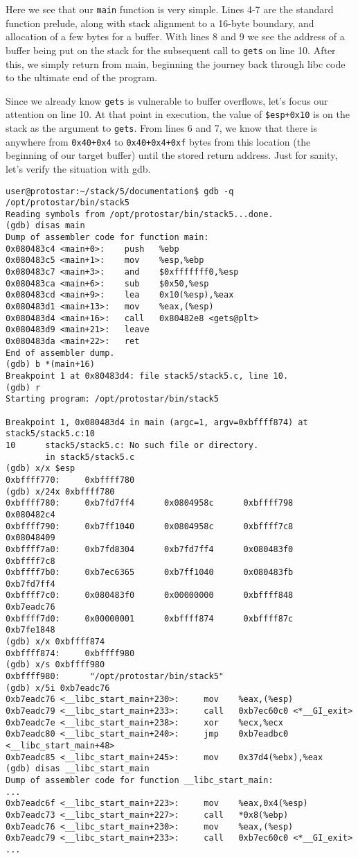 Here we see that our \texttt{main} function is very simple. Lines 4-7 are the standard function prelude, along
with stack alignment to a 16-byte boundary, and allocation of a few bytes for a buffer. With lines 8 and 9
we see the address of a buffer being put on the stack for the subsequent call to \texttt{gets} on line 10. After this,
we simply return from main, beginning the journey back through libc code to the ultimate end of the program.

Since we already know \texttt{gets} is vulnerable to buffer overflows, let's focus our attention on line 10.
At that point in execution, the value of \texttt{\$esp+0x10} is on the stack as the argument to \texttt{gets}.
From lines 6 and 7, we know that there is anywhere from \texttt{0x40+0x4} to \texttt{0x40+0x4+0xf} bytes
from this location (the beginning of our target buffer) until the stored return address. Just for sanity, 
let's verify the situation with gdb.

\begin{lstlisting}
user@protostar:~/stack/5/documentation$ gdb -q /opt/protostar/bin/stack5
Reading symbols from /opt/protostar/bin/stack5...done.
(gdb) disas main
Dump of assembler code for function main:
0x080483c4 <main+0>:    push   %ebp
0x080483c5 <main+1>:    mov    %esp,%ebp
0x080483c7 <main+3>:    and    $0xfffffff0,%esp
0x080483ca <main+6>:    sub    $0x50,%esp
0x080483cd <main+9>:    lea    0x10(%esp),%eax
0x080483d1 <main+13>:   mov    %eax,(%esp)
0x080483d4 <main+16>:   call   0x80482e8 <gets@plt>
0x080483d9 <main+21>:   leave  
0x080483da <main+22>:   ret    
End of assembler dump.
(gdb) b *(main+16)
Breakpoint 1 at 0x80483d4: file stack5/stack5.c, line 10.
(gdb) r
Starting program: /opt/protostar/bin/stack5 

Breakpoint 1, 0x080483d4 in main (argc=1, argv=0xbffff874) at stack5/stack5.c:10
10      stack5/stack5.c: No such file or directory.
        in stack5/stack5.c
(gdb) x/x $esp
0xbffff770:     0xbffff780
(gdb) x/24x 0xbffff780
0xbffff780:     0xb7fd7ff4      0x0804958c      0xbffff798      0x080482c4
0xbffff790:     0xb7ff1040      0x0804958c      0xbffff7c8      0x08048409
0xbffff7a0:     0xb7fd8304      0xb7fd7ff4      0x080483f0      0xbffff7c8
0xbffff7b0:     0xb7ec6365      0xb7ff1040      0x080483fb      0xb7fd7ff4
0xbffff7c0:     0x080483f0      0x00000000      0xbffff848      0xb7eadc76
0xbffff7d0:     0x00000001      0xbffff874      0xbffff87c      0xb7fe1848
(gdb) x/x 0xbffff874
0xbffff874:     0xbffff980
(gdb) x/s 0xbffff980
0xbffff980:      "/opt/protostar/bin/stack5"
(gdb) x/5i 0xb7eadc76
0xb7eadc76 <__libc_start_main+230>:     mov    %eax,(%esp)
0xb7eadc79 <__libc_start_main+233>:     call   0xb7ec60c0 <*__GI_exit>
0xb7eadc7e <__libc_start_main+238>:     xor    %ecx,%ecx
0xb7eadc80 <__libc_start_main+240>:     jmp    0xb7eadbc0 <__libc_start_main+48>
0xb7eadc85 <__libc_start_main+245>:     mov    0x37d4(%ebx),%eax
(gdb) disas __libc_start_main
Dump of assembler code for function __libc_start_main:
...
0xb7eadc6f <__libc_start_main+223>:     mov    %eax,0x4(%esp)
0xb7eadc73 <__libc_start_main+227>:     call   *0x8(%ebp)
0xb7eadc76 <__libc_start_main+230>:     mov    %eax,(%esp)
0xb7eadc79 <__libc_start_main+233>:     call   0xb7ec60c0 <*__GI_exit>
...
\end{lstlisting}

